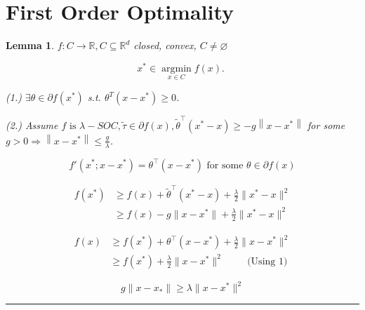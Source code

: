 \documentclass[twoside]{article}
\newtheorem{lemma}[theorem]{Lemma}
\newenvironment{proof}{{\bf Proof:}}{\hfill\rule{2mm}{2mm}}
\begin{document}
\section{First Order Optimality}
\begin{lemma}

$f : C \rightarrow \mathbb{R}, C \subseteq \mathbb{R}^{d}$ closed, convex, $C \neq \varnothing$

$$
x^{*} \in \underset{x \in C}{\operatorname{argmin}} f(x) \text {. }
$$


(1.) $\exists \theta \in \partial f\left(x^{*}\right)$ s.t. $\theta^{T}\left(x-x^{*}\right) \geq 0$.

(2.) Assume $f \text{ is } \lambda-S O C, \tilde{\tau} \in \partial f(x), \tilde{\theta}^{\top}\left(x^{*}-x\right) \geq-g\left\|x-x^{*}\right\|$ for some $g>0 \Rightarrow\left\|x-x^{*}\right\| \leq \frac{g}{\lambda}$.
\end{lemma}

\begin{proof}
\begin{equation*}
    f'(x^*; x-x^*) = \theta^\top (x-x^*) \text{ for some $\theta \in  \partial f(x)$}
\end{equation*}

\begin{align*}
    f(x^*) &\geqslant f(x) + \tilde{\theta}^\top (x^* - x) + \frac{\lambda}{2} \|x^* - x\|^2 \\
    &\geqslant f(x) - g \|x - x^*\| + \frac{\lambda}{2} \|x^* - x\|^2
\end{align*}

\begin{align*}
    f(x) &\geq f(x^*) + \theta^\top (x - x^*) + \frac{\lambda}{2} \|x - x^*\|^2 \\
    &\geqslant f(x^*) + \frac{\lambda}{2} \|x - x^*\|^2 \hspace{1cm} \text{(Using 1)}
\end{align*}

\begin{equation*}
    g \|x - x_*\| \geqslant \lambda \|x - x^*\|^2
\end{equation*}

\hspace{6cm} 

\end{proof}
\end{document}

